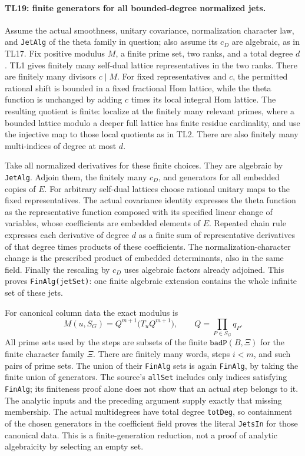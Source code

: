 \documentclass[11pt,a4paper]{article}
\numberwithin{equation}{section}
\theoremstyle{remark}\newtheorem{remark}[theorem]{Remark}
\begin{document}
\paragraph{TL19: finite generators for all bounded-degree normalized
jets.}
Assume the actual smoothness, unitary covariance, normalization
character law, and \texttt{JetAlg} of the theta family in question;
also assume its $c_D$ are algebraic, as in TL17. Fix positive
modulus $M$, a finite prime set, two ranks, and a total degree
$d$. TL1 gives finitely many self-dual lattice representatives
in the two ranks. There are finitely many divisors $c\mid M$.
For fixed representatives and $c$, the permitted rational shift
is bounded in a fixed fractional Hom lattice, while the theta
function is unchanged by adding $c$ times its local integral
Hom lattice. The resulting quotient is finite: localize at the
finitely many relevant primes, where a bounded lattice modulo
a deeper full lattice has finite residue cardinality, and use
the injective map to those local quotients as in TL2.
There are also finitely many multi-indices of degree at most
$d$.

Take all normalized derivatives for these finite choices.
They are algebraic by \texttt{JetAlg}. Adjoin them, the finitely
many $c_D$, and generators for all embedded copies of $E$.
For arbitrary self-dual lattices choose rational unitary maps
to the fixed representatives. The actual covariance identity
expresses the theta function as the representative function
composed with its specified linear change of variables, whose
coefficients are embedded elements of $E$. Repeated chain rule
expresses each derivative of degree $d$ as a finite sum of
representative derivatives of that degree times products of
these coefficients. The normalization-character change is
the prescribed product of embedded determinants, also in the
same field. Finally the rescaling by $c_D$ uses algebraic
factors already adjoined. This proves \texttt{FinAlg(jetSet)}:
one finite algebraic extension contains the whole infinite
set of these jets.

For canonical column data the exact modulus is
\[
 M(u,S_G)=Q^{m+1}\bigl(T_u Q^{m+1}\bigr),
 \qquad Q=\prod_{P\in S_G}q_P.                    \tag{TL.21}
\]
All prime sets used by the steps are subsets of the finite
$\texttt{badP}(B,\Xi)$ for the finite character family $\Xi$.
There are finitely many words, steps $i<m$, and such pairs of
prime sets. The union of their \texttt{FinAlg} sets is again
\texttt{FinAlg}, by taking the finite union of generators.
The source's \texttt{allSet} includes only indices satisfying
\texttt{FinAlg}; its finiteness proof alone does not show that
an actual step belongs to it. The analytic inputs and the
preceding argument supply exactly that missing membership.
The actual multidegrees have total degree \texttt{totDeg},
so containment of the chosen generators in the coefficient
field proves the literal \texttt{JetsIn} for those canonical
data. This is a finite-generation reduction, not a proof of
analytic algebraicity by selecting an empty set.
\end{document}
